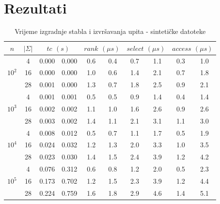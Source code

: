 \documentclass[times, utf8, seminar, numeric]{fer}
\begin{document}
\chapter{Rezultati}
\label{sec:results}

\begin{table}[h]
\caption{Vrijeme izgradnje stabla i izvršavanja upita - sintetičke datoteke}
\centering
  \begin{tabular}{c|c|c|c|c|c|c|c|c|c}
    $n$ & $|\Sigma|$ & \multicolumn{2}{c|}{$tc$ $(s)$} &
    \multicolumn{2}{c|}{$rank$ $(\mu s)$} & \multicolumn{2}{c|}{$select$ $(\mu s)$} & \multicolumn{2}{c}{$access$ $(\mu s)$}\\ \hline
    \multirow{3}{*}{$10^2$}
      & \num{4} & \num{0.000} & \num{0.000} & \num{0.6} & \num{0.4} & \num{0.7} & \num{1.1} & \num{0.3} & \num{1.0} \\
      & \num{16} & \num{0.000} & \num{0.000} & \num{1.0} & \num{0.6} & \num{1.4} & \num{2.1} & \num{0.7} & \num{1.8} \\
      & \num{28} & \num{0.001} & \num{0.000} & \num{1.3} & \num{0.7} & \num{1.8} & \num{2.5} & \num{0.9} & \num{2.1} \\
    \hline
    \multirow{3}{*}{$10^3$}
      & \num{4} & \num{0.001} & \num{0.001} & \num{0.5} & \num{0.5} & \num{0.9} & \num{1.4} & \num{0.4} & \num{1.4} \\
      & \num{16} & \num{0.002} & \num{0.002} & \num{1.1} & \num{1.0} & \num{1.6} & \num{2.6} & \num{0.9} & \num{2.6} \\
      & \num{28} & \num{0.003} & \num{0.002} & \num{1.4} & \num{1.1} & \num{2.1} & \num{3.1} & \num{1.1} & \num{3.0} \\
    \hline
    \multirow{3}{*}{$10^4$}
      & \num{4} & \num{0.008} & \num{0.012} & \num{0.5} & \num{0.7} & \num{1.1} & \num{1.7} & \num{0.5} & \num{1.9} \\
      & \num{16} & \num{0.024} & \num{0.032} & \num{1.2} & \num{1.3} & \num{2.0} & \num{3.3} & \num{1.0} & \num{3.5} \\
      & \num{28} & \num{0.023} & \num{0.030} & \num{1.4} & \num{1.5} & \num{2.4} & \num{3.9} & \num{1.2} & \num{4.2} \\
    \hline
    \multirow{3}{*}{$10^5$}
      & \num{4} & \num{0.076} & \num{0.312} & \num{0.6} & \num{0.8} & \num{1.2} & \num{2.0} & \num{0.5} & \num{2.3} \\
      & \num{16} & \num{0.173} & \num{0.702} & \num{1.2} & \num{1.5} & \num{2.3} & \num{3.9} & \num{1.2} & \num{4.4} \\
      & \num{28} & \num{0.224} & \num{0.759} & \num{1.6} & \num{1.8} & \num{2.9} & \num{4.6} & \num{1.4} & \num{5.1} \\

\end{tabular}
\end{table}
\end{document}
